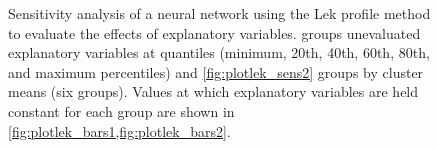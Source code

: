 \documentclass[article]{jss}
\begin{document}
\begin{figure}[t!]
\centering
{}

\caption{Sensitivity analysis of a neural network using the Lek profile method to evaluate the effects of explanatory variables.   groups unevaluated explanatory variables at quantiles (minimum, 20th, 40th, 60th, 80th, and maximum percentiles) and \cref{fig:plotlek_sens2} groups by cluster means (six groups).  Values at which explanatory variables are held constant for each group are shown in \cref{fig:plotlek_bars1,fig:plotlek_bars2}.}
\label{fig:plotlek_sens}
\end{figure}
\end{document}

